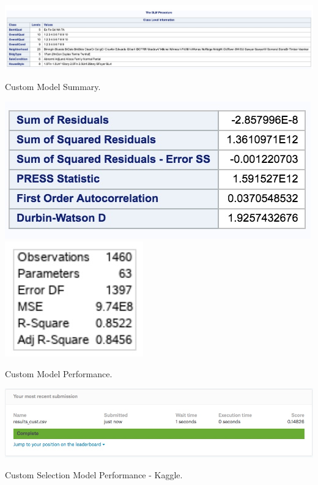 \documentclass[11pt]{scrartcl} %
\begin{document}
\begin{table}[H] %
	\centering %
	\includegraphics[scale=.25]{../graphics/A2Custfeatures}
	\caption{Custom Model Summary.}
	\label{tab:A2Custsummary}
\end{table}
\hrulefill
\begin{table}[H] %
	\centering %
	\includegraphics[scale=.3]{../graphics/A2Custresults}\\
	\includegraphics[scale=.3]{../graphics/A2CustR2}
	\caption{Custom Model Performance.}
	\label{tab:A2Custperf}
\end{table}
\hrulefill
\begin{table}[H] %
	\centering %
	\includegraphics[scale=.4]{../graphics/A2CustKaggle}
	\caption{Custom Selection Model Performance - Kaggle.}
	\label{tab:A2CustKaggle}
\end{table}
\end{document}
